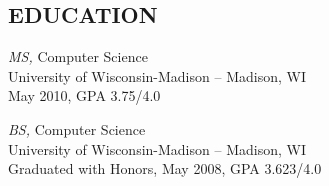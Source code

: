 \documentclass[line,margin]{res}
\begin{document}
\begin{resume}
\section{EDUCATION} {\sl MS,} Computer Science \\
        	     	University of Wisconsin-Madison -- Madison, WI \\ 
                	May 2010, GPA 3.75/4.0

		{\sl BS,} Computer Science \\
		University of Wisconsin-Madison -- Madison, WI \\
		Graduated with Honors, May 2008, GPA 3.623/4.0

\end{resume}
\end{document}
